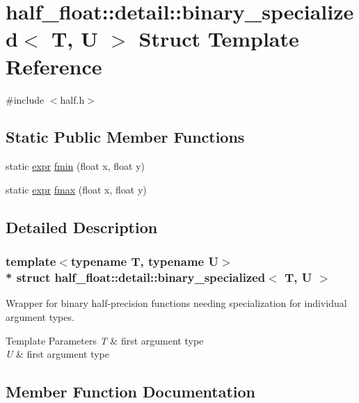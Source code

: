 \hypertarget{structhalf__float_1_1detail_1_1binary__specialized}{}\section{half\+\_\+float\+:\+:detail\+:\+:binary\+\_\+specialized$<$ T, U $>$ Struct Template Reference}
\label{structhalf__float_1_1detail_1_1binary__specialized}


{\ttfamily \#include $<$half.\+h$>$}

\subsection*{Static Public Member Functions}
\begin{DoxyCompactItemize}
\item 
static \hyperlink{structhalf__float_1_1detail_1_1expr}{expr} \hyperlink{structhalf__float_1_1detail_1_1binary__specialized_afb9ec4bebd2df86f570d20a6e7c6392f}{fmin} (float x, float y)
\item 
static \hyperlink{structhalf__float_1_1detail_1_1expr}{expr} \hyperlink{structhalf__float_1_1detail_1_1binary__specialized_a3d46871722c0a117f1921cc11bf47a89}{fmax} (float x, float y)
\end{DoxyCompactItemize}


\subsection{Detailed Description}
\subsubsection*{template$<$typename T, typename U$>$\\*
struct half\+\_\+float\+::detail\+::binary\+\_\+specialized$<$ T, U $>$}

Wrapper for binary half-\/precision functions needing specialization for individual argument types. 
\begin{DoxyTemplParams}{Template Parameters}
{\em T} & first argument type \\
\hline
{\em U} & first argument type \\
\hline
\end{DoxyTemplParams}


\subsection{Member Function Documentation}
